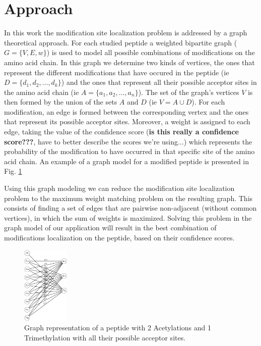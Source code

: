 \documentclass{bioinfo}
\begin{document}

\section{Approach}

In this work the modification site localization problem is addressed by a graph theoretical approach. For each studied peptide a weighted bipartite graph ($G = \{V,E,w\}$) is used to model all possible combinations of modifications on the amino acid chain. In this graph we determine two kinds of vertices, the ones that represent the different modifications that have occured in the peptide (ie $D = \{d_1, d_2, \dots, d_k\}$) and the ones that represent all their possible acceptor sites in the amino acid chain (ie $A = \{a_1, a_2, \dots, a_n\}$). The set of the graph's vertices $V$ is then formed by the union of the sets $A$ and $D$ (ie $V = A \cup D$). For each modification, an edge is formed between the corresponding vertex and the ones that represent its possible acceptor sites. Moreover, a weight is assigned to each edge, taking the value of the confidence score (\textbf{is this really a confidence score???}, have to better describe the scores we're using...) which represents the probability of the modification to have occurred in that specific site of the amino acid chain. An example of a graph model for a modified peptide is presented in Fig. \ref{fig:PMMP_model}

Using this graph modeling we can reduce the modification site localization problem to the maximum weight matching problem on the resulting graph. This consists of finding a set of edges that are pairwise non-adjacent (without common vertices), in which the sum of weights is maximized. Solving this problem in the graph model of our application will result in the best combination of modifications localization on the peptide, based on their confidence scores. 

\begin{figure}[!tpb]%
\centerline{\includegraphics[width=0.2\textwidth]{pmmp_model.eps}}
\caption{Graph representation of a peptide with 2 Acetylations and 1 Trimethylation with all their possible acceptor sites.}\label{fig:PMMP_model}
\end{figure}
\end{document}
